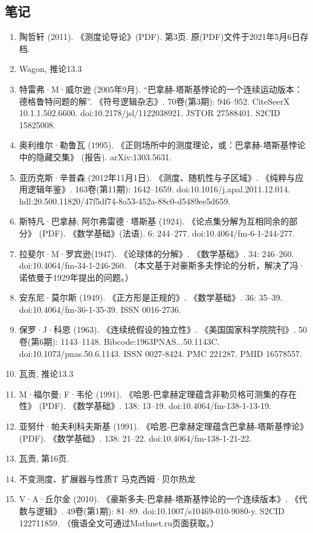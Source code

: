 \subsection{笔记}  
\begin{enumerate}
\item 陶哲轩 (2011). 《测度论导论》(PDF). 第3页. 原(PDF)文件于2021年5月6日存档.  
\item Wagon, 推论13.3  
\item 特雷弗·M·威尔逊 (2005年9月). “巴拿赫-塔斯基悖论的一个连续运动版本：德格鲁特问题的解”. 《符号逻辑杂志》. 70卷(第3期): 946–952. CiteSeerX 10.1.1.502.6600. doi:10.2178/jsl/1122038921. JSTOR 27588401. S2CID 15825008.  
\item 奥利维尔·勒鲁瓦 (1995). 《正则场所中的测度理论，或：巴拿赫-塔斯基悖论中的隐藏交集》 (报告). arXiv:1303.5631.  
\item 亚历克斯·辛普森 (2012年11月1日). 《测度、随机性与子区域》. 《纯粹与应用逻辑年鉴》. 163卷(第11期): 1642–1659. doi:10.1016/j.apal.2011.12.014. hdl:20.500.11820/47f5df74-8a53-452a-88c0-d5489ee5d659.  
\item 斯特凡·巴拿赫; 阿尔弗雷德·塔斯基 (1924). 《论点集分解为互相同余的部分》 (PDF). 《数学基础》(法语). 6: 244–277. doi:10.4064/fm-6-1-244-277.  
\item 拉斐尔·M·罗宾逊(1947). 《论球体的分解》. 《数学基础》. 34: 246–260. doi:10.4064/fm-34-1-246-260. （本文基于对豪斯多夫悖论的分析，解决了冯·诺依曼于1929年提出的问题。）  
\item 安东尼·莫尔斯 (1949). 《正方形是正规的》. 《数学基础》. 36: 35–39. doi:10.4064/fm-36-1-35-39. ISSN 0016-2736.  
\item 保罗·J·科恩 (1963). 《连续统假设的独立性》. 《美国国家科学院院刊》. 50卷(第6期): 1143–1148. Bibcode:1963PNAS...50.1143C. doi:10.1073/pnas.50.6.1143. ISSN 0027-8424. PMC 221287. PMID 16578557.  
\item 瓦贡, 推论13.3  
\item M·福尔曼; F·韦伦 (1991). 《哈恩-巴拿赫定理蕴含非勒贝格可测集的存在性》 (PDF). 《数学基础》. 138: 13–19. doi:10.4064/fm-138-1-13-19.  
\item 亚努什·帕夫利科夫斯基 (1991). 《哈恩-巴拿赫定理蕴含巴拿赫-塔斯基悖论》 (PDF). 《数学基础》. 138: 21–22. doi:10.4064/fm-138-1-21-22.  
\item 瓦贡, 第16页.  
\item 不变测度、扩展器与性质T 马克西姆·贝尔热龙  
\item V·A·丘尔金 (2010). 《豪斯多夫-巴拿赫-塔斯基悖论的一个连续版本》. 《代数与逻辑》. 49卷(第1期): 81–89. doi:10.1007/s10469-010-9080-y. S2CID 122711859. （俄语全文可通过Mathnet.ru页面获取。） 
\end{enumerate}



 

